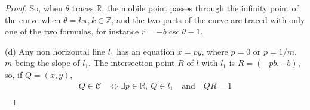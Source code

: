 \documentclass[11pt,a4paper]{article}
\newcommand{\Z}{\mathbb{Z}}
\newcommand{\R}{\mathbb{R}}
\begin{document}
\begin{proof}
So, when  $\theta$ traces $\R$, the mobile point passes through the infinity point of the curve when $\theta = k\pi, k \in \Z$, and the two parts of the curve are traced with only one of the two formulas, for instance $r = -b \csc \theta +1$.                                                                                                                                                                                                                                                                                                                                                                                                                                                                                                                                                                                                                                                                                                                                                                                                                                                                                                                                                                                                                                                                                                                                                                                                                                                                                                                                                                                                                                                                                                                                                                                                                                                                                                                                                                                                                                                                                                                                                                                                                 
\item[(d)]
Any non horizontal line $l_1$ has an equation $x = py$, where $p = 0$ or $p = 1/m$, $m$ being the slope of $l_1$.
The intersection point $R$ of $l$ with $l_1$ is $R = (-pb,-b)$, so, if $Q = (x,y)$,
\begin{align*}
Q \in  \mathscr{C}  &\iff \exists p \in \R,\ Q \in l_1 \quad \mathrm{and} \quad QR = 1\\

\end{align*}
\end{proof}
\end{document}
